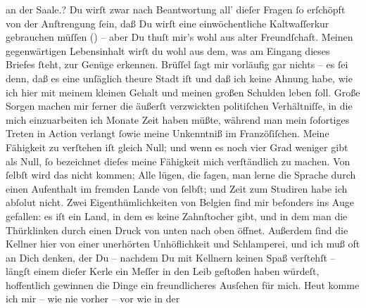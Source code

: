 \begin{ledgroupsized}[t]{13cm}
{{{                     an der Saale.}}}\label{K_L02663-5h}? Du wirſt zwar nach Beantwortung all’ dieſer Fragen
               ſo erſchöpft von der Anſtrengung ſein, daß Du wirſt eine einwöchentliche
               Kaltwaſſerkur gebrauchen müſſen (\label{K_L02663-6v}\label{K_L02663-6h}) – aber Du thuſt mir’s
               wohl aus alter Freundſchaft.\pend
           \pstart
           Meinen gegenwärtigen Lebensinhalt wirſt du wohl aus dem, was am Eingang dieses
               Briefes ſteht, zur Genüge erkennen. Brüſſel ſagt
               mir vorläufig gar nichts – es ſei denn, daß es eine unſäglich theure Stadt iſt und daß ich keine Ahnung habe, wie
               ich hier mit meinem kleinen Gehalt und meinen großen Schulden leben ſoll. Große
               Sorgen machen mir ferner die äußerſt verzwickten politiſchen Verhältniſſe, in die
               mich einzuarbeiten ich Monate Zeit haben müßte, während man {\pb}mein ſofortiges Treten in Action verlangt ſowie
               meine Unkenntniß im Franzöſiſchen. Meine Fähigkeit zu verſtehen iſt gleich Null; und
               wenn es noch vier Grad weniger gibt als Null, ſo bezeichnet dieſes meine Fähigkeit
               mich verſtändlich zu machen. Von ſelbſt wird das nicht kommen; Alle lügen, die ſagen,
               man lerne die Sprache durch einen Aufenthalt im fremden Lande von ſelbſt; und Zeit
               zum Studiren habe ich abſolut nicht. Zwei Eigenthümlichkeiten von Belgien ſind mir beſonders ins Auge gefallen: es iſt ein Land, in dem es keine
               Zahnſtocher gibt, und in dem man die Thürklinken durch einen Druck von unten nach
               oben öffnet. Außerdem ſind die Kellner hier von einer unerhörten Unhöflichkeit und
               Schlamperei, und ich muß oft an Dich denken, der Du – nachdem Du mit Kellnern keinen
               Spaß verſtehſt – längſt einem dieſer Kerle ein Meſſer in den Leib geſtoßen haben
               würdeſt, hoffentlich gewinnen die Dinge ein freundlicheres Ausſehen für mich. Heut komme ich mir – wie nie vorher – vor wie in der

\end{ledgroupsized}
